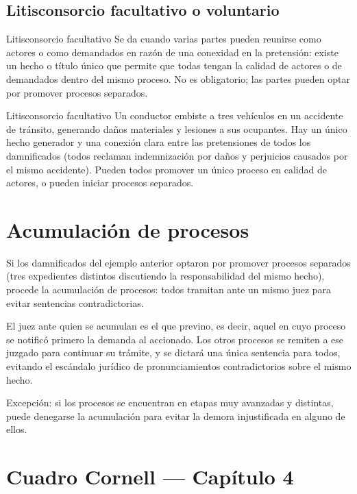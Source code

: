 \documentclass[12pt,oneside]{book}
\begin{document}
\subsection{Litisconsorcio facultativo o voluntario}

\begin{definition}{Litisconsorcio facultativo}
Se da cuando varias partes pueden reunirse como actores o como demandados en razón de una conexidad en la pretensión: existe un hecho o título único que permite que todas tengan la calidad de actores o de demandados dentro del mismo proceso. No es obligatorio; las partes pueden optar por promover procesos separados.
\end{definition}

\begin{example}{Litisconsorcio facultativo}
Un conductor embiste a tres vehículos en un accidente de tránsito, generando daños materiales y lesiones a sus ocupantes. Hay un único hecho generador y una conexión clara entre las pretensiones de todos los damnificados (todos reclaman indemnización por daños y perjuicios causados por el mismo accidente). Pueden todos promover un único proceso en calidad de actores, o pueden iniciar procesos separados.
\end{example}

\section{Acumulación de procesos}

Si los damnificados del ejemplo anterior optaron por promover procesos separados (tres expedientes distintos discutiendo la responsabilidad del mismo hecho), procede la acumulación de procesos: todos tramitan ante un mismo juez para evitar sentencias contradictorias.

El juez ante quien se acumulan es el que previno, es decir, aquel en cuyo proceso se notificó primero la demanda al accionado. Los otros procesos se remiten a ese juzgado para continuar su trámite, y se dictará una única sentencia para todos, evitando el escándalo jurídico de pronunciamientos contradictorios sobre el mismo hecho.

\begin{note}
Excepción: si los procesos se encuentran en etapas muy avanzadas y distintas, puede denegarse la acumulación para evitar la demora injustificada en alguno de ellos.
\end{note}

\section*{Cuadro Cornell --- Capítulo 4}
\end{document}
